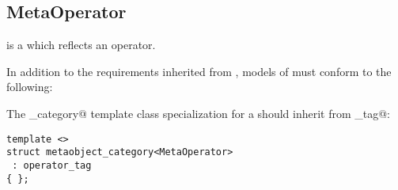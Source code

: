 \subsection{MetaOperator}
\label{concept-MetaOperator}


 is a  which reflects an operator.

In addition to the requirements inherited from ,
models of  must conform to the following:

The \verb@metaobject_category@ template class specialization for a  should
inherit from \verb@operator_tag@:

\begin{verbatim}
template <>
struct metaobject_category<MetaOperator>
 : operator_tag
{ };
\end{verbatim}

